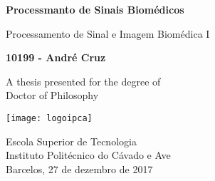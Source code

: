\begin{titlepage}
    \begin{center}
        
        \vspace*{1cm}
        
        \textbf{Processmanto de Sinais Biomédicos}
        
        \vspace{0.5cm}
        Processamento de Sinal e Imagem Biomédica I
        
        \vspace{1.5cm}
        
        \textbf{10199 - André Cruz}
        
        \vfill
        
        A thesis presented for the degree of\\
        Doctor of Philosophy
        
        \vspace{0.8cm}
        
        \texttt{[image: logoipca]}
        
        Escola Superior de Tecnologia\\
        Instituto Politécnico do Cávado e Ave\\
        Barcelos, 27 de dezembro de 2017
        
    \end{center}
\end{titlepage}